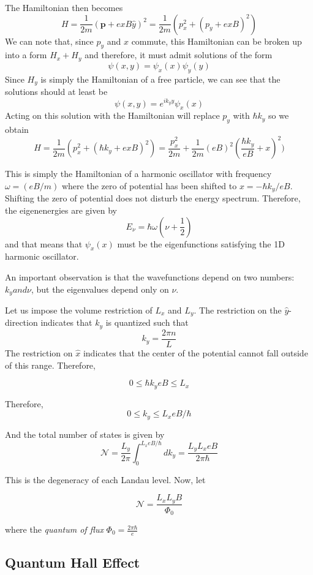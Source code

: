 \documentclass[10pt]{article}
\begin{document}
The Hamiltonian then becomes
$$
H = \frac{1}{2m}(\textbf{p} + exB\hat{y})^{2} = \frac{1}{2m}\left ( p_{x}^{2} + (p_{y} + exB)^{2}\right )
$$
We can note that, since $p_{y}$ and $x$ commute, this Hamiltonian can be broken up into a form $H_{x} + H_{y}$ and
therefore, it must admit solutions of the form
$$\psi(x,y) = \psi_{x}(x)\psi_{y}(y)$$
Since $H_{y}$ is simply the Hamiltonian of a free particle, we can see that the solutions should at least be
$$
\psi(x,y) = e^{ik_{y}y}\psi_{x}(x)
$$
Acting on this solution with the Hamiltonian will replace $p_{y}$ with $\hbar k_{y}$ so we obtain
$$
H = \frac{1}{2m}\left ( p_{x}^{2} + (\hbar k_{y} + exB)^{2}\right ) = \frac{p_{x}^{2}}{2m} + \frac{1}{2m}(eB)^{2}(\frac{\hbar k_{y}}{eB} + x)^{2}  )
$$

This is simply the Hamiltonian of a harmonic oscillator with frequency $\omega = (eB/m)$ where the zero of potential has been shifted to $x = -\hbar k_{y}/eB$. Shifting the zero of
potential does not disturb the energy spectrum. Therefore, the eigenenergies are given by
$$
E_{\nu} = \hbar \omega(\nu + \frac{1}{2})
$$
and that means that $\psi_{x}(x)$ must be the eigenfunctions satisfying the 1D harmonic oscillator.

An important observation is that the wavefunctions depend on two numbers: $k_{y} and \nu$, but the eigenvalues depend only on $\nu$.

Let us impose the volume restriction of $L_{x}$ and $L_{y}$. The restriction on the $\hat{y}$-direction indicates that $k_{y}$ is
quantized such that
$$
k_{y} = \frac{2\pi n}{L}
$$
The restriction on $\hat{x}$ indicates that the center of the potential cannot fall outside of this range. Therefore,

$$
0 \leq \hbar k_{y}{eB} \leq L_{x}
$$

Therefore,
$$
0 \leq k_{y} \leq L_{x}eB/\hbar
$$

And the total number of states is given by
$$
\mathcal{N} = \frac{L_{y}}{2\pi} \int_{0}^{L_{x}eB/\hbar} dk_{y} =  \frac{L_{y}L_{x}eB}{2\pi\hbar}
$$

This is the degeneracy of each Landau level. Now, let

$$
\mathcal{N} = \frac{L_{x}L_{y}B}{\Phi_{0}}
$$

where the \emph{quantum of flux} $\Phi_{0} = \frac{2\pi\hbar}{e}$
\subsection{Quantum Hall Effect}
\end{document}
